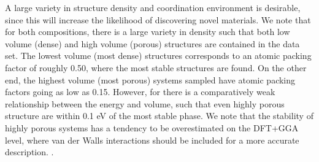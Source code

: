 A large variety in structure density and coordination environment is desirable, since this will increase the likelihood of discovering novel materials. We note that for both compositions, there is a large variety in density such that both low volume (dense) and high volume (porous) structures are contained in the data set. The lowest volume (most dense) structures corresponds to an atomic packing factor of roughly 0.50, where the most stable structures are found. On the other end, the highest volume (most porous) systems sampled have atomic packing factors going as low as 0.15.
%
However, for \IrOthree there is a comparatively weak relationship between the energy and volume,
such that even highly porous structure are within 0.1 eV of the most stable phase. We note that the stability of highly porous systems has a tendency to be overestimated on the DFT+GGA level, where van der Walls interactions should be included for a more accurate description. \cite{}. %

%

%


